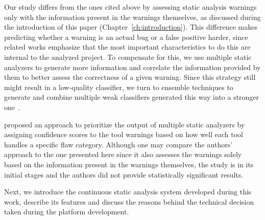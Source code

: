Our study differs from the ones cited above by assessing static analysis
warnings only with the information present in the warnings themselves, as
discussed during the introduction of this paper
(Chapter~\ref{ch:introduction}).  This difference makes predicting whether a warning is
an actual bug or a false positive harder, since related works emphasize that
the most important characteristics to do this are internal to the analyzed
project. To compensate for this, we use multiple static analyzers to generate
more information and correlate the information provided by them to better
assess the correctness of a given warning.  Since this strategy still might
result in a low-quality classifier, we turn to ensemble techniques to generate
and combine multiple weak classifiers generated this way into a stronger
one~\citep{aima}.

\cite{xypolytos2017framework} proposed an approach to
prioritize the output of multiple static analyzers by assigning confidence
scores to the tool warnings based on how well each tool handles a specific flaw
category. Although one may compare the authors' approach to the one presented here
since it also assesses the warnings solely based on the information present in the
warnings themselves, the study is in its initial stages and the authors did not
provide statistically significant results.

Next, we introduce the continuous static analysis system developed during this
work, describe its features and discuss the reasons behind the technical
decision taken during the platform development.
